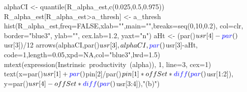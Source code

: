 \documentclass[
  11pt,
]{article}
\newenvironment{Shaded}{}{}
\newcommand{\DataTypeTok}[1]{#1}
\newcommand{\DecValTok}[1]{#1}
\newcommand{\FloatTok}[1]{#1}
\newcommand{\KeywordTok}[1]{\textcolor[rgb]{0.00,0.00,1.00}{#1}}
\newcommand{\NormalTok}[1]{#1}
\newcommand{\OperatorTok}[1]{#1}
\newcommand{\OtherTok}[1]{\textcolor[rgb]{1.00,0.25,0.00}{#1}}
\newcommand{\StringTok}[1]{\textcolor[rgb]{0.00,0.50,0.50}{#1}}
\begin{document}
\begin{Shaded}
\begin{Highlighting}[]
\NormalTok{alphaCI <-}\StringTok{ }\KeywordTok{quantile}\NormalTok{(R_alpha_est,}\KeywordTok{c}\NormalTok{(}\FloatTok{0.025}\NormalTok{,}\FloatTok{0.5}\NormalTok{,}\FloatTok{0.975}\NormalTok{))}
\NormalTok{R_alpha_est[R_alpha_est}\OperatorTok{>}\NormalTok{a_thresh] <-}\StringTok{ }\NormalTok{a_thresh}
\KeywordTok{hist}\NormalTok{(R_alpha_est,}\DataTypeTok{freq=}\OtherTok{FALSE}\NormalTok{,}\DataTypeTok{xlab=}\StringTok{""}\NormalTok{,}\DataTypeTok{main=}\StringTok{""}\NormalTok{,}\DataTypeTok{breaks=}\KeywordTok{seq}\NormalTok{(}\DecValTok{0}\NormalTok{,}\DecValTok{10}\NormalTok{,}\FloatTok{0.2}\NormalTok{),}
     \DataTypeTok{col=}\NormalTok{clr, }\DataTypeTok{border=}\StringTok{"blue3"}\NormalTok{, }\DataTypeTok{ylab=}\StringTok{""}\NormalTok{, }\DataTypeTok{cex.lab=}\FloatTok{1.2}\NormalTok{, }\DataTypeTok{yaxt=}\StringTok{"n"}\NormalTok{)}
\NormalTok{aHt <-}\StringTok{ }\NormalTok{(}\KeywordTok{par}\NormalTok{()}\OperatorTok{$}\NormalTok{usr[}\DecValTok{4}\NormalTok{]}\OperatorTok{-}\KeywordTok{par}\NormalTok{()}\OperatorTok{$}\NormalTok{usr[}\DecValTok{3}\NormalTok{])}\OperatorTok{/}\DecValTok{12}
\KeywordTok{arrows}\NormalTok{(alphaCI,}\KeywordTok{par}\NormalTok{()}\OperatorTok{$}\NormalTok{usr[}\DecValTok{3}\NormalTok{],alphaCI,}\KeywordTok{par}\NormalTok{()}\OperatorTok{$}\NormalTok{usr[}\DecValTok{3}\NormalTok{]}\OperatorTok{-}\NormalTok{aHt,}
       \DataTypeTok{code=}\DecValTok{1}\NormalTok{,}\DataTypeTok{length=}\FloatTok{0.05}\NormalTok{,}\DataTypeTok{xpd=}\OtherTok{NA}\NormalTok{,}\DataTypeTok{col=}\StringTok{"blue3"}\NormalTok{,}\DataTypeTok{lwd=}\FloatTok{1.5}\NormalTok{)}
\KeywordTok{mtext}\NormalTok{(}\KeywordTok{expression}\NormalTok{(Instrinsic}\OperatorTok{~}\NormalTok{productivity}\OperatorTok{~}\NormalTok{(alpha)), }\DecValTok{1}\NormalTok{, }\DataTypeTok{line=}\DecValTok{3}\NormalTok{, }\DataTypeTok{cex=}\DecValTok{1}\NormalTok{)}
\KeywordTok{text}\NormalTok{(}\DataTypeTok{x=}\KeywordTok{par}\NormalTok{()}\OperatorTok{$}\NormalTok{usr[}\DecValTok{1}\NormalTok{]}\OperatorTok{+}\KeywordTok{par}\NormalTok{()}\OperatorTok{$}\NormalTok{pin[}\DecValTok{2}\NormalTok{]}\OperatorTok{/}\KeywordTok{par}\NormalTok{()}\OperatorTok{$}\NormalTok{pin[}\DecValTok{1}\NormalTok{]}\OperatorTok{*}\NormalTok{offSet}\OperatorTok{*}\KeywordTok{diff}\NormalTok{(}\KeywordTok{par}\NormalTok{()}\OperatorTok{$}\NormalTok{usr[}\DecValTok{1}\OperatorTok{:}\DecValTok{2}\NormalTok{]),}
     \DataTypeTok{y=}\KeywordTok{par}\NormalTok{()}\OperatorTok{$}\NormalTok{usr[}\DecValTok{4}\NormalTok{]}\OperatorTok{-}\NormalTok{offSet}\OperatorTok{*}\KeywordTok{diff}\NormalTok{(}\KeywordTok{par}\NormalTok{()}\OperatorTok{$}\NormalTok{usr[}\DecValTok{3}\OperatorTok{:}\DecValTok{4}\NormalTok{]),}\StringTok{"(b)"}\NormalTok{)}


\end{Highlighting}
\end{Shaded}
\end{document}
